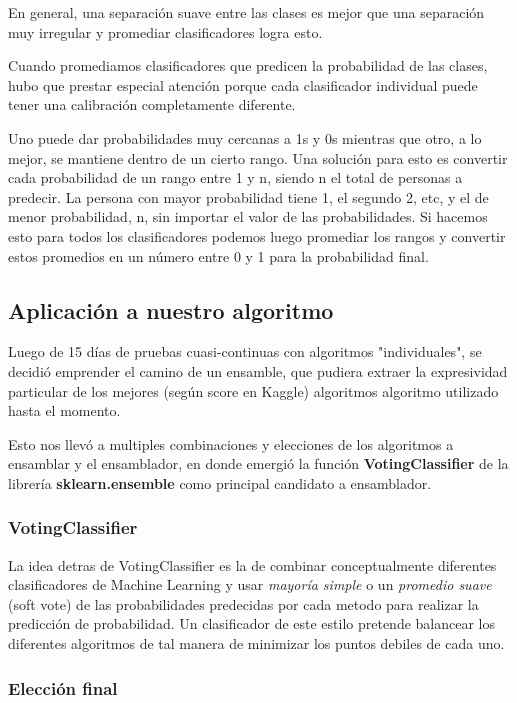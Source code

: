 \documentclass[a4paper ,12pt]{article}
\begin{document}
En general, una separación suave entre las clases es mejor que una separación
muy irregular y promediar clasificadores logra esto.

Cuando promediamos clasificadores que predicen la probabilidad de las clases, hubo
que prestar especial atención porque cada clasificador individual puede tener una calibración completamente diferente. 

Uno puede dar probabilidades muy cercanas a 1s y 0s mientras que otro, a lo mejor, se mantiene dentro de un cierto rango.
Una solución para esto es convertir cada probabilidad de un rango entre 1 y n, siendo n el total de personas a predecir. La persona con mayor probabilidad tiene 1,
el segundo 2, etc, y el de menor probabilidad, n, sin importar el valor de las probabilidades. Si hacemos esto para todos los clasificadores podemos luego
promediar los rangos y convertir estos promedios en un número entre 0 y 1 para la probabilidad final.

\newpage
\subsection{Aplicación a nuestro algoritmo}

Luego de 15 días de pruebas cuasi-continuas con algoritmos "individuales", se decidió emprender el camino de un ensamble, que pudiera extraer la expresividad particular de los mejores (según score en Kaggle) algoritmos  algoritmo utilizado hasta el momento.

Esto nos llevó a multiples combinaciones y elecciones de los algoritmos a ensamblar y el ensamblador, en donde emergió la función \textbf{ VotingClassifier} de la librería \textbf{sklearn.ensemble} como principal candidato a ensamblador.


\subsubsection{VotingClassifier}

La idea detras de VotingClassifier es la de combinar conceptualmente diferentes clasificadores de Machine Learning y usar \textit{mayoría simple} o un \textit{promedio suave} (soft vote) de las probabilidades predecidas por cada metodo para realizar la predicción de probabilidad. Un clasificador de este estilo pretende balancear los diferentes algoritmos de tal manera de minimizar los puntos debiles de cada uno.


\subsubsection{Elección final}
\end{document}
